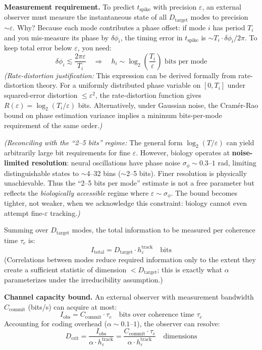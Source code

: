 \documentclass[12pt]{article}
\begin{document}
\textbf{Measurement requirement.} To predict $t_{\text{spike}}$ with precision $\varepsilon$, an external observer must measure the instantaneous state of all $D_{\text{target}}$ modes to precision $\sim \varepsilon$. Why? Because each mode contributes a phase offset: if mode $i$ has period $T_i$ and you mis-measure its phase by $\delta\phi_i$, the timing error in $t_{\text{spike}}$ is $\sim T_i \cdot \delta\phi_i / 2\pi$. To keep total error below $\varepsilon$, you need:
\begin{equation}
\delta\phi_i \lesssim \frac{2\pi \varepsilon}{T_i} \quad \Rightarrow \quad h_i \sim \log_2\left(\frac{T_i}{\varepsilon}\right) \text{ bits per mode}
\end{equation}
\textit{(Rate-distortion justification:} This expression can be derived formally from rate-distortion theory. For a uniformly distributed phase variable on $[0, T_i]$ under squared-error distortion $\le \varepsilon^2$, the rate-distortion function gives $R(\varepsilon) = \log_2(T_i/\varepsilon)$ bits. Alternatively, under Gaussian noise, the Cramér-Rao bound on phase estimation variance implies a minimum bits-per-mode requirement of the same order.\textit{)}

\textit{(Reconciling with the ``2--5 bits'' regime:} The general form $\log_2(T/\varepsilon)$ can yield arbitrarily large bit requirements for fine $\varepsilon$. However, biology operates at \textbf{noise-limited resolution}: neural oscillations have phase noise $\sigma_\phi \sim 0.3$--$1$ rad, limiting distinguishable states to $\sim$4--32 bins ($\sim$2--5 bits). Finer resolution is physically unachievable. Thus the ``2--5 bits per mode'' estimate is not a free parameter but reflects the \textit{biologically accessible} regime where $\varepsilon \sim \sigma_\phi$. The bound becomes tighter, not weaker, when we acknowledge this constraint: biology cannot even attempt fine-$\varepsilon$ tracking.\textit{)}

Summing over $D_{\text{target}}$ modes, the total information to be measured per coherence time $\tau_e$ is:
\begin{equation}
I_{\text{total}} = D_{\text{target}} \cdot h_\varepsilon^{\text{track}} \quad \text{bits}
\end{equation}
(Correlations between modes reduce required information only to the extent they create a sufficient statistic of dimension $< D_{\text{target}}$; this is exactly what $\alpha$ parameterizes under the irreducibility assumption.)

\textbf{Channel capacity bound.} An external observer with measurement bandwidth $C_{\text{commit}}$ (bits/s) can acquire at most:
\begin{equation}
I_{\text{obs}} = C_{\text{commit}} \cdot \tau_e \quad \text{bits over coherence time } \tau_e
\end{equation}
Accounting for coding overhead ($\alpha \sim 0.1$--$1$), the observer can resolve:
\begin{equation}
D_{\text{crit}} = \frac{I_{\text{obs}}}{\alpha \cdot h_\varepsilon^{\text{track}}} = \frac{C_{\text{commit}} \cdot \tau_e}{\alpha \cdot h_\varepsilon^{\text{track}}} \quad \text{dimensions}
\end{equation}
\end{document}
